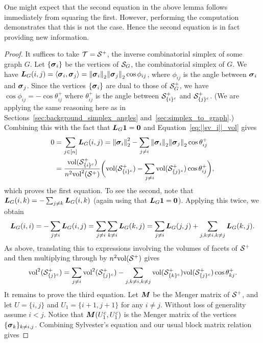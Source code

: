 \begin{remark}
	One might expect that the second equation in the above lemma follows immediately from squaring the first. However, performing the computation demonstrates that this is not the case. Hence the second equation is in  fact providing new information. 
\end{remark}
\begin{proof}
	It suffices to take $\mathcal{T}=\mathcal{S}^+$, the  inverse combinatorial simplex of some graph $G$.  Let $\{\vb*{\sigma}_i\}$ be the vertices of $\mathcal{S}_G$, the combinatorial simplex of $G$. 	
	We have $\vb*{L}_G(i,j)=\langle\vb*{\sigma}_i,\vb*{\sigma}_j\rangle = \norm{\vb*{\sigma}_i}_2\norm{\vb*{\sigma}_j}_2\cos\phi_{ij}$, where $\phi_{ij}$ is the angle between $\vb*{\sigma}_i$ and $\vb*{\sigma}_j$. Since the vertices $\{\vb*{\sigma}_i\}$ are  dual to those of $\mathcal{S}^+_G$, we have $\cos\phi_{ij}=-\cos\theta^+_{ij}$ where $\theta^+_{ij}$ is the angle between $\mathcal{S}^+_{\{i\}^c}$ and $\mathcal{S}^+_{\{j\}^c}$. (We are applying the same reasoning here as in Sections~\ref{sec:background_simplex_angles} and~\ref{sec:simplex_to_graph}.) Combining this with the fact that $\vb*{L}_G\vb{1}=\vb{0}$ and Equation~\eqref{eq:||sv_i||_vol} gives
	\begin{align*}
	0 &= \sum_{j\in[n]} \vb*{L}_G(i,j) = \norm{\vb*{\sigma}_i}_2^2 - \sum_{j\neq i}\norm{\vb*{\sigma}_i}_2\norm{\vb*{\sigma}_j}_2\cos\theta_{ij}^+ \\
	&= \frac{\textnormal{vol}(\mathcal{S}_{\{i\}^c}^+)}{n^2\textnormal{vol}^2(\mathcal{S}^+)} \bigg(\textnormal{vol}(\mathcal{S}^+_{\{i\}^c}) - \sum_{j\neq i}\textnormal{vol}(\mathcal{S}_{\{j\}^c}^+)\cos\theta_{ij}^+\bigg),
	\end{align*}
	which proves the first equation. To see the second,  note that $\vb*{L}_G(i,k)=-\sum_{j\neq k}\vb*{L}_G(i,k)$  (again using that $\vb*{L}_G\vb{1}=\vb{0}$). Applying  this twice, we obtain 
	\[\vb*{L}_G(i,i) = -\sum_{j\neq i}\vb*{L}_G(i,j) = \sum_{j\neq i}\sum_{k\neq i}\vb*{L}_G(k,j) = \sum_{j\neq i}\vb*{L}_G(j,j) + \sum_{j,k\neq i,k\neq j}\vb*{L}_G(k,j).\] 
	As above,  translating this to expressions involving the volumes of facets of $\mathcal{S}^+$ and then multiplying through by $n^2\textnormal{vol}(\mathcal{S}^+)$ gives  
	\begin{equation*}
	\textnormal{vol}^2(\mathcal{S}_{\{j\}^c}^+) = \sum_{j\neq i}\textnormal{vol}^2(\mathcal{S}_{\{j\}^c}^+) - \sum_{j,k\neq i,k\neq j} \textnormal{vol}(\mathcal{S}_{\{k\}^c}^+)\textnormal{vol}(\mathcal{S}_{\{j\}^c}^+)\cos\theta_{kj}^+. 
	\end{equation*}
	It remains to  prove  the  third equation.  Let ${\vb*{M}}$ be  the Menger matrix of $\mathcal{S}^+$, and  let $U=\{i,j\}$  and  $U_1=\{i+1,j+1\}$ for any $i\neq j$. Without loss of generality assume  $i<j$. 
	Notice that ${\vb*{M}}(U_1^c,U_1^c)$ is the Menger matrix of the vertices $\{\vb*{\sigma}_k\}_{k\neq i,j}$. 
	Combining Sylvester's equation and our usual block matrix relation gives 

\end{proof}
